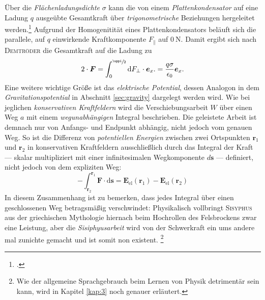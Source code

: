 Über die \textit{Flächenladungsdichte} $\sigma$ kann die von einem \textit{Plattenkondensator} auf eine Ladung $q$ ausgeübte Gesamtkraft über \textit{trigonometrische} Beziehungen hergeleitet werden.\vspace{-0.5cm}\footcite[vgl.][S.\,6]{Demtroeder2009}
\vspace{0.5cm}
Aufgrund der Homogenitität eines Plattenkondensators  beläuft sich die parallele, auf $q$ einwirkende Kraftkomponente $F_\parallel$ auf $\SI{0}{\newton}$. Damit ergibt sich nach \textsc{Demtröder} die Gesamtkraft auf die Ladung zu 
\begin{equation}
\label{eq:kraft2}
2\cdot \boldsymbol{F} = \int_{0}^{\sfrac{\uppi}{2}}\mathrm{d}F_\perp\cdot\boldsymbol{e}_x.=\frac{q\sigma}{\epsilon_0}\boldsymbol{e}_x.
\end{equation} 
Eine weitere wichtige Größe ist das \textit{elektrische Potential}, dessen Analogon in dem \textit{Gravitationspotential} in Abschnitt \ref{sec:gravity} dargelegt werden wird. Wie bei jeglichen \textit{konservativen Kraftfeldern} wird die Verschiebungsarbeit $W$ über einen Weg $a$ mit einem \textit{wegunabhängigen} Integral beschrieben. Die geleistete Arbeit ist demnach nur von Anfangs- und Endpunkt abhängig, nicht jedoch vom genauen Weg.\vspace*{-2cm}\vspace*{2cm} So ist die Differenz von \textit{potentiellen Energien} zwischen zwei Ortspunkten $\boldsymbol{r}_1$ und $\boldsymbol{r}_2$ in konservativen Kraftfeldern ausschließlich durch das Integral der Kraft --- skalar multipliziert mit einer infinitesimalen Wegkomponente $d\boldsymbol{s}$ --- definiert, nicht jedoch von dem expliziten Weg:
\begin{equation}
\label{eq:epot}
-\int_{\boldsymbol{r}_2}^{\boldsymbol{r}_1}\boldsymbol{F}\cdot\mathrm{d}\boldsymbol{s}=\boldsymbol{E}_\mathrm{el}(\boldsymbol{r}_1)-\boldsymbol{E}_\mathrm{el}(\boldsymbol{r}_2)
\end{equation}
In diesem Zusammenhang ist zu bemerken, dass jedes Integral über einen geschlossenen Weg betragsmäßig verschwindet: Physikalisch vollbringt \textsc{Sisyphus} aus der griechischen Mythologie hiernach beim Hochrollen des Felsbrockens zwar eine Leistung, aber die \textit{Sisiphyusarbeit} wird von der Schwerkraft ein ums andere mal zunichte gemacht und ist somit non existent. \vspace*{-1.3cm}\footnote{Wie der allgemeine Sprachgebrauch beim Lernen von Physik detrimentär sein kann, wird in Kapitel \ref{kap:3} noch genauer erläutert.}\vspace*{1.3cm}\par
